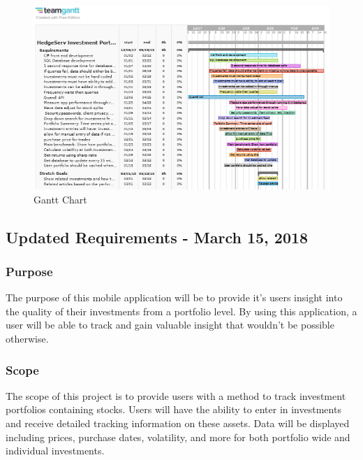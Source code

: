 \documentclass[onecolumn, draftclsnofoot,10pt, compsoc]{IEEEtran}
\begin{document}
\begin{figure}[h]
\centering
\captionsetup{justification=centering}
\includegraphics[width=7in]{require/ganttchart.PNG}
\caption{Gantt Chart}
\end{figure}

\newpage
\subsection{Updated Requirements - March 15, 2018}

\subsubsection{Purpose}
The purpose of this mobile application will be to provide it's users insight into the quality of their investments from a portfolio level. 
By using this application, a user will be able to track and gain valuable insight that wouldn't be possible otherwise.

\subsubsection{Scope}
The scope  of this project is to provide users with a method to track investment portfolios containing stocks. Users will have the ability  to enter in investments and receive detailed tracking information on these assets. Data will be displayed including prices, purchase dates, volatility, and more for both portfolio wide and individual investments.
\end{document}

